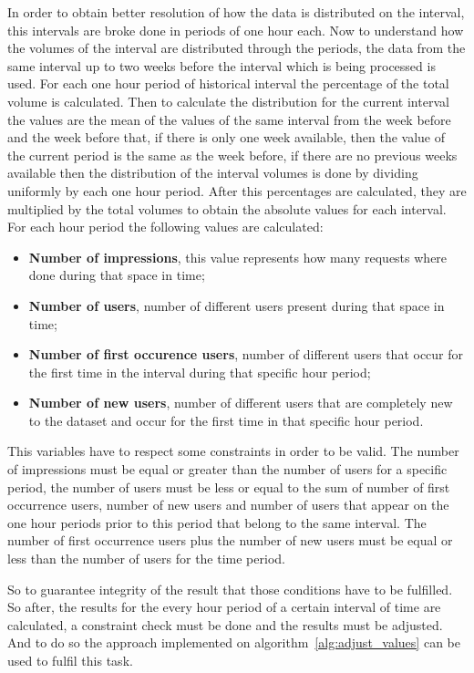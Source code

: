 In order to obtain better resolution of how the data is distributed on the
interval, this intervals are broke done in periods of one hour each. Now to
understand how the volumes of the interval are distributed through the periods,
the data from the same interval up to two weeks before the interval which is
being processed is used. For each one hour period of historical interval the
percentage of the total volume is calculated. Then to calculate the distribution
for the current interval the values are the mean of the values of the same interval from the week before
and the week before that, if there is only one week available, then the value of
the current period is the same as the week before, if there are no previous
weeks available then the distribution of the interval volumes is done by
dividing uniformly by each one hour period. After this percentages are
calculated, they are multiplied by the total volumes to obtain the absolute
values for each interval.
\\
For each hour period the following values are calculated:
\begin{itemize}
  \item \textbf{Number of impressions}, this value represents how many requests
    where done during that space in time;
  \item \textbf{Number of users}, number of different users present during that
    space in time;
  \item \textbf{Number of first occurence users}, number of different users that
    occur for the first time in the interval during that specific hour period;
  \item \textbf{Number of new users}, number of different users that are
    completely new to the dataset and occur for the first time in that specific
    hour period.
\end{itemize}

This variables have to respect some constraints in order to be valid. The number
of impressions must be equal or greater than the number of users for a specific
period, the number of users must be less or equal to the sum of number of first
occurrence users, number of new users and number of users that appear on the one
hour periods prior to this period that belong to the same interval. The number
of first occurrence users plus the number of new users must be equal or less
than the number of users for the time period.

So to guarantee integrity of the result that those conditions have to be
fulfilled. So after, the results for the every hour period of a certain interval
of time are calculated, a constraint check must be done and the results must be
adjusted. And to do so the approach implemented on
algorithm~\ref{alg:adjust_values} can be used to fulfil this task.
\\

